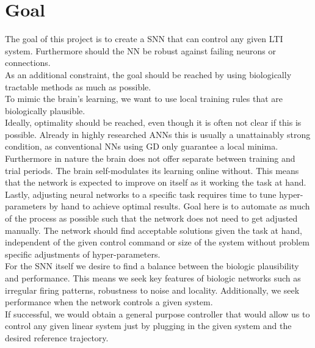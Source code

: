 \section{Goal}\label{sec:goal}
The goal of this project is to create a \ac{SNN} that can control any given \ac{LTI} system. Furthermore should the \ac{NN} be robust against failing neurons or connections.\\
As an additional constraint, the goal should be reached by using biologically tractable methods as much as possible.\\
To mimic the brain's learning, we want to use local training rules that are biologically plausible.\\
Ideally, optimality should be reached, even though it is often not clear if this is possible. Already in highly researched \acp{ANN} this is usually a unattainably strong condition, as conventional \acp{NN} using \ac{GD} only guarantee a local minima.\\
Furthermore in nature the brain does not offer separate between training and trial periods. The brain self-modulates its learning online without. This means that the network is expected to improve on itself as it working the task at hand.\\
Lastly, adjusting neural networks to a specific task requires time to tune hyper-parameters by hand to achieve optimal results. Goal here is to automate as much of the process as possible such that the network does not need to get adjusted manually. The network should find acceptable solutions given the task at hand, independent of the given control command or size of the system without problem specific adjustments of hyper-parameters.\\
For the \ac{SNN} itself we desire to find a balance between the biologic plausibility and performance. This means we seek key features of biologic networks such as irregular firing patterns, robustness to noise and locality. Additionally, we seek performance when the network controls a given system.\\
If successful, we would obtain a general purpose controller that would allow us to control any given linear system just by plugging in the given system and the desired reference trajectory.\\

